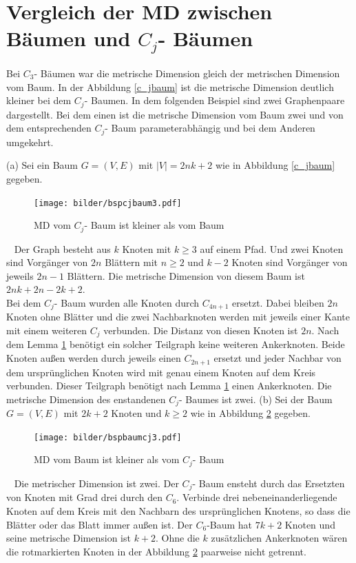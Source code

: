 \section{Vergleich der MD zwischen Bäumen und $C_j$- Bäumen}
Bei $C_3$- Bäumen war die metrische Dimension gleich der metrischen Dimension vom Baum. In der Abbildung \ref{c_jbaum} ist die metrische Dimension deutlich kleiner bei dem $C_j$- Baumen. In dem folgenden Beispiel sind zwei Graphenpaare dargestellt. Bei dem einen ist die metrische Dimension vom Baum zwei und von dem entsprechenden $C_j$- Baum parameterabhängig und bei dem Anderen umgekehrt.\\
\begin{bsp} (a) Sei ein Baum $G=(V,E)$ mit $|V|=2nk+2$ wie in Abbildung \ref{c_jbaum} gegeben.

\begin{figure}[ht]
\centering
\texttt{[image: bilder/bspcjbaum3.pdf]}
\caption{MD vom $C_j$- Baum ist kleiner als vom Baum}
\label{cjbaum}
\end{figure}
\vspace{-5mm}
~\linebreak
Der Graph besteht aus $k$ Knoten mit $k\geq 3$ auf einem Pfad. Und zwei Knoten sind Vorgänger von $2n$ Blättern mit $n\geq 2$ und $k-2$ Knoten sind Vorgänger von jeweils $2n-1$ Blättern. Die metrische Dimension von diesem Baum ist $2nk+2n-2k+2$.\\
Bei dem $C_j$- Baum wurden alle Knoten durch $C_{4n+1}$ ersetzt. Dabei bleiben $2n$ Knoten ohne Blätter und die zwei Nachbarknoten werden mit jeweils einer Kante mit einem weiteren $C_j$ verbunden. Die Distanz von diesen Knoten ist $2n$. Nach dem Lemma \ref{} benötigt ein solcher Teilgraph keine weiteren Ankerknoten. Beide Knoten außen werden durch jeweils einen $C_{2n+1}$ ersetzt und jeder Nachbar von dem ursprünglichen Knoten wird mit genau einem Knoten auf dem Kreis verbunden. Dieser Teilgraph benötigt nach Lemma \ref{} einen Ankerknoten. Die metrische Dimension des enstandenen $C_j$- Baumes ist zwei.\newline\newline
(b) Sei der Baum $G=(V,E)$ mit $2k+2$ Knoten und $k\geq 2$ wie in Abbildung \ref{baumcj} gegeben.
\begin{figure}[ht]
\centering
\texttt{[image: bilder/bspbaumcj3.pdf]}
\caption{MD vom Baum ist kleiner als vom $C_j$- Baum}
\label{baumcj}
\end{figure}
\vspace{-3mm}
~\linebreak
Die metrischer Dimension ist zwei. Der $C_j$- Baum ensteht durch das Ersetzten von Knoten mit Grad drei durch den $C_6$. Verbinde drei nebeneinanderliegende Knoten auf dem Kreis mit den Nachbarn des ursprünglichen Knotens, so dass die Blätter oder das Blatt immer außen ist. Der $C_6$-Baum hat $7k+2$ Knoten und seine metrische Dimension ist $k+2$. Ohne die $k$ zusätzlichen Ankerknoten wären die rotmarkierten Knoten in der Abbildung \ref{baumcj} paarweise nicht getrennt.
\end{bsp}
